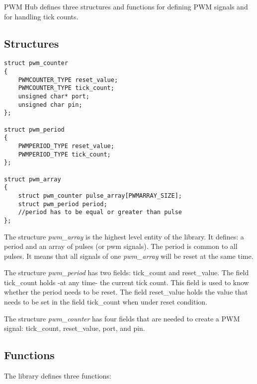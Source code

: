 \documentclass[a4paper,10pt] {article} %
\begin{document}
PWM Hub defines three structures and functions for defining PWM signals and for 
handling tick counts. 

\subsection{Structures}

\begin{lstlisting}
struct pwm_counter
{
    PWMCOUNTER_TYPE reset_value;
    PWMCOUNTER_TYPE tick_count;
    unsigned char* port;
    unsigned char pin;
};

struct pwm_period
{
    PWMPERIOD_TYPE reset_value;
    PWMPERIOD_TYPE tick_count;
};

struct pwm_array
{
    struct pwm_counter pulse_array[PWMARRAY_SIZE];
    struct pwm_period period; 
    //period has to be equal or greater than pulse
};
\end{lstlisting}

The structure \emph{pwm\_array} is the highest level entity of the library. It 
defines: a period and an array of pulses (or pwm signals). The period is common 
to all pulses. It means that all signals of one \emph{pwm\_array} will be 
reset at the same time.

The structure \emph{pwm\_period} has two fields: tick\_count and reset\_value. 
The field tick\_count holds -at any time- the current tick count. This field is 
used to know whether the period needs to be reset. The field reset\_value holds 
the value that needs to be set in the field tick\_count when under reset 
condition.

The structure \emph{pwm\_counter} has four fields that are needed to create a 
PWM signal: tick\_count, reset\_value, port, and pin. 

\subsection{Functions}

The library defines three functions: 
\end{document}
